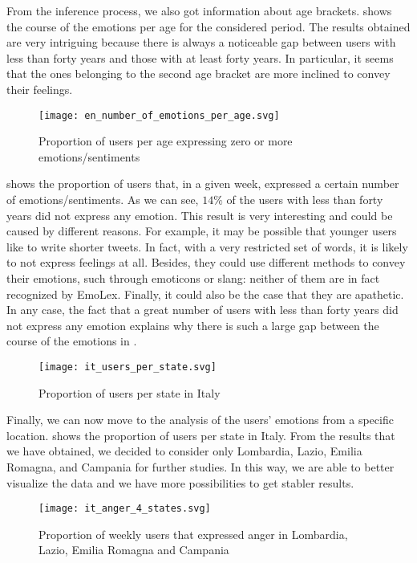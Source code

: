 From the inference process, we also got information about age brackets.  shows the course of the emotions per age for the considered period. The results obtained are very intriguing because there is always a noticeable gap between users with less than forty years and those with at least forty years. In particular, it seems that the ones belonging to the second age bracket are more inclined to convey their feelings.

\begin{figure}[H]
	\centering
    	\texttt{[image: en\_number\_of\_emotions\_per\_age.svg]}
    	\caption{Proportion of users per age expressing zero or more emotions/sentiments}
    	\label{fig:en-4-emotions-per-age-per-number}
\end{figure}

 shows the proportion of users that, in a given week, expressed a certain number of emotions/sentiments. As we can see, \(14 \%\) of the users with less than forty years did not express any emotion. This result is very interesting and could be caused by different reasons. For example, it may be possible that younger users like to write shorter tweets. In fact, with a very restricted set of words, it is likely to not express feelings at all. Besides, they could use different methods to convey their emotions, such through emoticons or slang: neither of them are in fact recognized by EmoLex. Finally, it could also be the case that they are apathetic. In any case, the fact that a great number of users with less than forty years did not express any emotion explains why there is such a large gap between the course of the emotions in .

\begin{figure}[H]
	\centering
    	\texttt{[image: it\_users\_per\_state.svg]}
    	\caption{Proportion of users per state in Italy}
    	\label{fig:it-users-state}
\end{figure}

Finally, we can now move to the analysis of the users' emotions from a specific location.  shows the proportion of users per state in Italy. From the results that we have obtained, we decided to consider only Lombardia, Lazio, Emilia Romagna, and Campania for further studies. In this way, we are able to better visualize the data and we have more possibilities to get stabler results. 

\begin{figure}[H]
	\centering
    	\texttt{[image: it\_anger\_4\_states.svg]}
    	\caption{Proportion of weekly users that expressed anger in Lombardia, Lazio, Emilia Romagna and Campania}
    	\label{fig:it-anger-4-states}
\end{figure}

